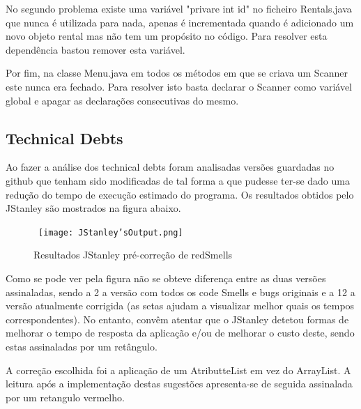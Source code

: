\par No segundo problema existe uma variável "privare int id" no ficheiro Rentals.java que nunca é utilizada para nada, apenas é incrementada quando é adicionado um novo objeto rental mas não tem um propósito no código. Para resolver esta dependência bastou remover esta variável.\newline 

\par Por fim, na classe Menu.java em todos os métodos em que se criava um Scanner este nunca era fechado. Para resolver isto basta declarar o Scanner como variável global e apagar as declarações consecutivas do mesmo.\newline


\subsection{Technical Debts}

Ao fazer a análise dos technical debts foram analisadas versões guardadas no github que tenham sido modificadas de tal forma a que pudesse ter-se dado uma redução do tempo de execução estimado do programa. Os resultados obtidos pelo JStanley são mostrados na figura abaixo.

\begin{figure}[H]

  \centering

  \hbox{\hspace{-8em} \texttt{[image: JStanley'sOutput.png]}}

  \caption {Resultados JStanley pré-correção de redSmells}

  \label {fig28}

\end{figure}

\par Como se pode ver pela figura  não se obteve diferença entre as duas versões assinaladas, sendo a 2 a versão com todos os code Smells e bugs originais e a 12 a versão atualmente corrigida (as setas ajudam a visualizar melhor quais os tempos correspondentes). No entanto, convêm atentar que o JStanley detetou formas de melhorar o tempo de resposta da aplicação e/ou de melhorar o custo deste, sendo estas assinaladas por um retângulo. \newline


\par A correção escolhida foi a aplicação de um AtributteList em vez do ArrayList. A leitura após a implementação destas sugestões apresenta-se de seguida assinalada por um retangulo vermelho.\newline


